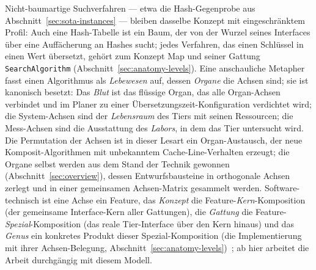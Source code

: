 \begin{nurkurz}
Nicht-baumartige Suchverfahren --- etwa die Hash-Gegenprobe aus Abschnitt~\ref{sec:sota-instances} ---
bleiben dasselbe Konzept mit eingeschränktem Profil: Auch eine Hash-Tabelle ist ein Baum, der von der Wurzel
seines Interfaces über eine Auffächerung an Hashes sucht; jedes Verfahren, das einen Schlüssel in einen Wert
übersetzt, gehört zum Konzept Map und seiner Gattung \texttt{SearchAlgorithm} (Abschnitt~\ref{sec:anatomy-levels}).
Eine anschauliche Metapher fasst einen Algorithmus als \emph{Lebewesen} auf, dessen \emph{Organe} die Achsen
sind; sie ist kanonisch besetzt: Das \emph{Blut} ist das flüssige Organ, das alle Organ-Achsen verbindet und im
Planer zu einer Übersetzungszeit-Konfiguration verdichtet wird; die System-Achsen sind der \emph{Lebensraum} des
Tiers mit seinen Ressourcen; die Mess-Achsen sind die Ausstattung des \emph{Labors}, in dem das Tier untersucht
wird. Die Permutation der Achsen ist in dieser Lesart ein Organ-Austausch, der neue Komposit-Algorithmen mit
unbekanntem Cache-Line-Verhalten erzeugt; die Organe selbst werden aus dem Stand der Technik gewonnen
(Abschnitt~\ref{sec:overview}), dessen Entwurfsbausteine in orthogonale Achsen zerlegt und in einer gemeinsamen
Achsen-Matrix gesammelt werden. Software-technisch ist eine Achse ein Feature, das \emph{Konzept} die
Feature-\emph{Kern}-Komposition (der gemeinsame Interface-Kern aller Gattungen), die \emph{Gattung} die
Feature-\emph{Spezial}-Komposition (das reale Tier-Interface über den Kern hinaus) und das \emph{Genus} ein
konkretes Produkt dieser Spezial-Komposition (die Implementierung mit ihrer Achsen-Belegung,
Abschnitt~\ref{sec:anatomy-levels})~\cite{apel2013feature,batory1992hierarchical}; ab hier arbeitet die Arbeit
durchgängig mit diesem Modell.
\end{nurkurz}

